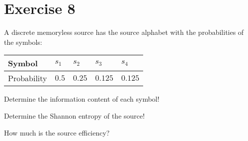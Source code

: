 %
%
%

{}
\section*{Exercise 8}




\begin{question}[subtitle={Information}]
	A discrete memoryless source has the source alphabet with the probabilities of the symbols:
	\begin{table}[H]
		\centering
		\begin{tabular}{|l|l|l|l|l|}
			\hline
			Symbol & $s_1$ & $s_2$ & $s_3$ & $s_4$ \\
			\hline
			Probability & $0.5$ & $0.25$ & $0.125$ & $0.125$ \\
			\hline
		\end{tabular}
	\end{table}

	\begin{tasks}
		\task
		Determine the information content of each symbol!
		
		\task
		Determine the Shannon entropy of the source!
		
		\task
		How much is the source efficiency?
	\end{tasks}
\end{question}

